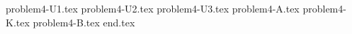 \documentclass{../../../../style/mkimain}
\begin{document}
{problem4-U1.tex}
{problem4-U2.tex}
{problem4-U3.tex}
{problem4-A.tex}
{problem4-K.tex}
{problem4-B.tex}
{end.tex}
\end{document}

